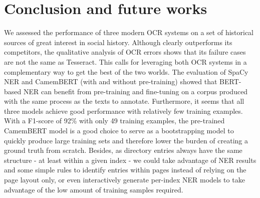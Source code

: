 \section{Conclusion and future works}
We assessed the performance of three modern OCR systems on a set of historical sources of great interest in social history.
Although \peroocr clearly outperforms its competitors, the qualitative analysis of OCR errors shows that its failure cases are not the same as Tesseract.
This calls for leveraging both OCR systems in a complementary way to get the best of the two worlds.
The evaluation of SpaCy NER and CamemBERT (with and without pre-training) showed that BERT-based NER can benefit from pre-training and fine-tuning on a corpus produced with the same process as the texts to annotate.
Furthermore, it seems that all three models achieve good performance with relatively few training examples.
With a F1-score of 92\% with only 49 training examples, the pre-trained CamemBERT model is a good choice to serve as a bootstrapping model to quickly produce large training sets and therefore lower the burden of creating a ground truth from scratch.
Besides, as directory entries always have the same structure - at least within a given index - we could take advantage of NER results and some simple rules to identify entries within pages instead of relying on the page layout only, or even interactively generate per-index NER models to take advantage of the low amount of training samples required.
